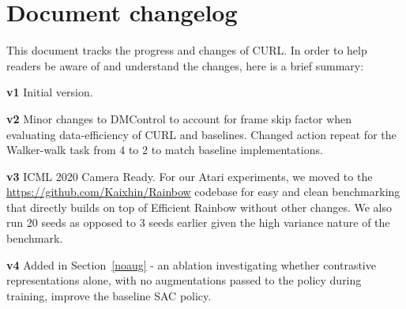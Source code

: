 \section{Document changelog}

This document tracks the progress and changes of CURL. In order to help readers be aware of and understand the changes, here is a brief summary:

{\bf v1} Initial version.

{\bf v2} Minor changes to DMControl to account for frame skip factor when evaluating data-efficiency of CURL and baselines. Changed action repeat for the Walker-walk task from 4 to 2 to match baseline implementations.       

{\bf v3} ICML 2020 Camera Ready. For our Atari experiments, we moved to the \url{https://github.com/Kaixhin/Rainbow} codebase for easy and clean benchmarking that directly builds on top of Efficient Rainbow without other changes. We also run 20 seeds as opposed to 3 seeds earlier given the high variance nature of the benchmark.  

{\bf v4} Added in Section~\ref{noaug} - an ablation investigating whether contrastive representations alone, with no augmentations passed to the policy during training, improve the baseline SAC policy.